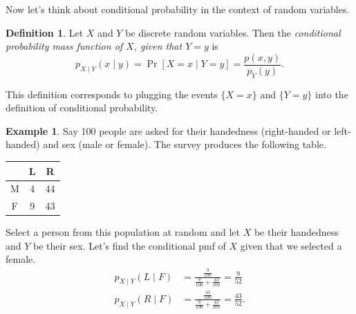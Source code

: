 \documentclass[12pt]{article}
\theoremstyle{plain}
\theoremstyle{definition}
\newtheorem{definition}[theorem]{Definition}
\newtheorem{example}[theorem]{Example}
\theoremstyle{remark}
\begin{document}
Now let's think about conditional probability in the context of random variables.
\begin{definition}
    Let $X$ and $Y$ be discrete random variables.
    Then the \emph{conditional probability mass function of $X$, given that $Y = y$} is
    \[
        p_{X\mid Y}(x\mid y) = \Pr[X = x\mid Y = y] = \frac{p(x,y)}{p_Y(y)}.
    \]
\end{definition}

This definition corresponds to plugging the events $\{X = x\}$ and $\{Y = y\}$ into the definition of conditional probability.

\begin{example}
    Say 100 people are asked for their handedness (right-handed or left-handed) and sex (male or female). The survey produces the following table.
    \begin{center}
    \begin{tabular}{|c || c | c|}
        \hline
           & L & R\\
        \hline
         M & 4 & 44\\
         F & 9 & 43\\
         \hline
    \end{tabular}
    \end{center}
    Select a person from this population at random and let $X$ be their handedness and $Y$ be their sex.
    Let's find the conditional pmf of $X$ given that we selected a female.
    \begin{align*}
        p_{X\mid Y}(L \mid F) &= \frac{\frac{9}{100}}{\frac{9}{100} + \frac{43}{100}} = \frac{9}{52}\\
        p_{X\mid Y}(R\mid F) &= \frac{\frac{43}{100}}{\frac{9}{100} + \frac{43}{100}} = \frac{43}{52}.
    \end{align*}
\end{example}
\end{document}
